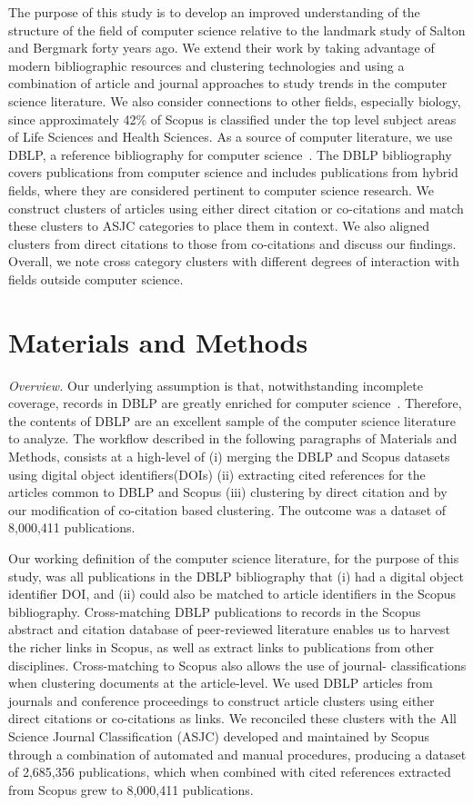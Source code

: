 The purpose of this study is to develop an improved understanding of the structure of the field of computer science relative to the landmark study of Salton and Bergmark forty years ago. We extend their work by taking advantage of modern bibliographic resources and clustering technologies and using a combination of article and journal approaches to study trends in the computer science literature. We also consider connections to other fields, especially biology, since approximately 42\% of Scopus is classified under the top level subject areas of Life Sciences and Health Sciences. As a source of computer  literature, we use DBLP, a reference bibliography for computer science~\cite{dblp_ref,pham_2010}. The DBLP bibliography covers publications from computer science and includes publications from hybrid fields, where they are considered pertinent to computer science research. We construct clusters of articles using either direct citation or co-citations and match these clusters to ASJC categories to place them in context. We also aligned clusters from direct citations to those from co-citations and discuss our findings. Overall, we note cross category clusters with different degrees of interaction with fields outside computer science.
\clearpage
\section{Materials and Methods}
\label{sec:methods}

\emph{Overview.} Our underlying assumption is that, notwithstanding incomplete coverage, records in DBLP are greatly enriched for computer science~\cite{dblp_ref,pham_2010}. Therefore, the contents of DBLP are an excellent sample of the computer science literature to analyze. The workflow described in the following paragraphs of Materials and Methods, consists at a high-level of (i) merging the DBLP and Scopus datasets using digital object identifiers(DOIs) (ii) extracting cited references for the articles common to DBLP and Scopus (iii) clustering by direct citation and by our modification of co-citation based clustering. The outcome was a dataset of 8,000,411 publications.

Our working definition of the computer science literature, for the purpose of this study, was all publications in the DBLP bibliography that (i) had a digital object identifier DOI, and (ii) could also be matched to article identifiers in the Scopus bibliography. Cross-matching DBLP publications to records in the Scopus abstract and citation database of peer-reviewed literature enables us to harvest the richer links in Scopus, as well as extract links to publications from other disciplines. Cross-matching to Scopus also allows the use of journal- classifications when clustering documents at the article-level. We used DBLP articles from journals and conference proceedings to construct article clusters using either direct citations or co-citations as links. We reconciled these clusters with the All Science Journal Classification (ASJC) developed and maintained by Scopus through a combination of automated and manual procedures, producing a dataset of  2,685,356 publications, which when combined with cited references extracted from Scopus grew to 8,000,411 publications.

